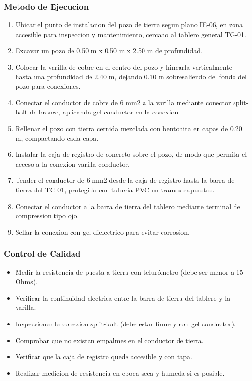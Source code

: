 \subsubsection{Metodo de Ejecucion}

\begin{enumerate}
  \item Ubicar el punto de instalacion del pozo de tierra segun plano IE-06, en zona accesible para inspeccion y mantenimiento, cercano al tablero general TG-01.
  \item Excavar un pozo de 0.50 m x 0.50 m x 2.50 m de profundidad.
  \item Colocar la varilla de cobre en el centro del pozo y hincarla verticalmente hasta una profundidad de 2.40 m, dejando 0.10 m sobresaliendo del fondo del pozo para conexiones.
  \item Conectar el conductor de cobre de 6 mm2 a la varilla mediante conector split-bolt de bronce, aplicando gel conductor en la conexion.
  \item Rellenar el pozo con tierra cernida mezclada con bentonita en capas de 0.20 m, compactando cada capa.
  \item Instalar la caja de registro de concreto sobre el pozo, de modo que permita el acceso a la conexion varilla-conductor.
  \item Tender el conductor de 6 mm2 desde la caja de registro hasta la barra de tierra del TG-01, protegido con tuberia PVC en tramos expuestos.
  \item Conectar el conductor a la barra de tierra del tablero mediante terminal de compression tipo ojo.
  \item Sellar la conexion con gel dielectrico para evitar corrosion.
\end{enumerate}

\subsubsection{Control de Calidad}

\begin{itemize}
  \item Medir la resistencia de puesta a tierra con telurómetro (debe ser menor a 15 Ohms).
  \item Verificar la continuidad electrica entre la barra de tierra del tablero y la varilla.
  \item Inspeccionar la conexion split-bolt (debe estar firme y con gel conductor).
  \item Comprobar que no existan empalmes en el conductor de tierra.
  \item Verificar que la caja de registro quede accesible y con tapa.
  \item Realizar medicion de resistencia en epoca seca y humeda si es posible.
\end{itemize}

